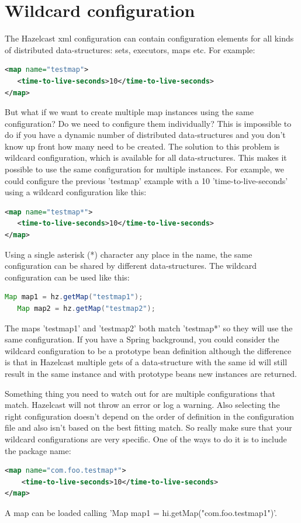 \section{Wildcard configuration}
The Hazelcast xml configuration can contain configuration elements for all kinds of distributed data-structures: sets, executors, maps etc. For example:
\begin{lstlisting}[language=xml]
<map name="testmap">
   <time-to-live-seconds>10</time-to-live-seconds>
</map>
\end{lstlisting}
But what if we want to create multiple map instances using the same configuration? Do we need to configure them individually? This is impossible to do if you have a dynamic number of distributed data-structures and you don't know up front how many need to be created. The solution to this problem is wildcard configuration, which is available for all data-structures. This makes it possible to use the same configuration for multiple instances. For example, we could configure the previous 'testmap' example with a 10 'time-to-live-seconds' using a wildcard configuration like this:
\begin{lstlisting}[language=xml]
<map name="testmap*">
   <time-to-live-seconds>10</time-to-live-seconds>
</map>
\end{lstlisting}
Using a single asterisk (*) character any place in the name, the same configuration can be shared by different  data-structures. The wildcard configuration can be used like this:
\begin{lstlisting}[language=java]
   Map map1 = hz.getMap("testmap1");
   Map map2 = hz.getMap("testmap2");
\end{lstlisting}
The maps 'testmap1' and 'testmap2' both match 'testmap*' so they will use the same configuration. If you have a Spring background, you could consider the wildcard configuration to be a prototype bean definition although the difference is that in Hazelcast multiple gets of a data-structure with the same id will still result in the same instance and with prototype beans new instances are returned.

Something thing you need to watch out for are multiple configurations that match. Hazelcast will not throw an error or log a warning. Also selecting the right configuration doesn't depend on the order of definition in the configuration file and also isn't based on the best fitting match. So really make sure that your wildcard configurations are very specific. One of the ways to do it is to include the package name:
\begin{lstlisting}[language=xml]
<map name="com.foo.testmap*">
    <time-to-live-seconds>10</time-to-live-seconds>
</map>
\end{lstlisting}
A map can be loaded calling 'Map map1 = hi.getMap("com.foo.testmap1")'. 

